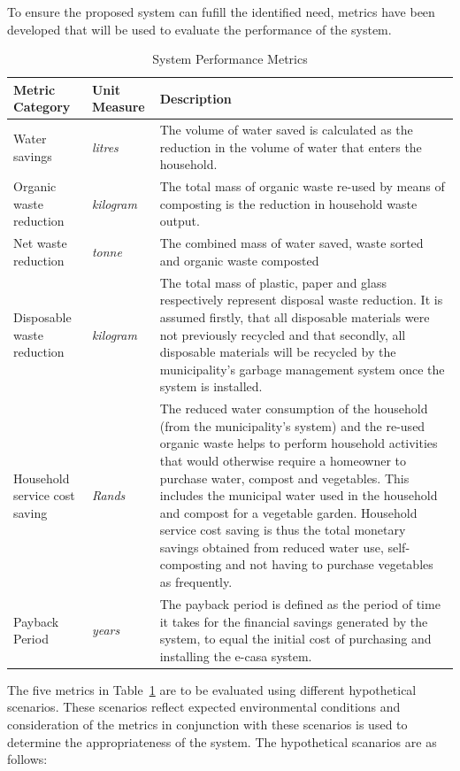 \documentclass[a4paper,11pt,fleqn]{report}
\begin{document}
To ensure the proposed system can fufill the identified need, metrics have been developed that will be used to evaluate the performance of the system.
%
\begin{table}[h!]
\caption {System Performance Metrics} \label{tb: Performance_Metrics} 
\begin{center}
\begin{tabular}{p{5cm}|p{3cm}|p{8cm}}\toprule
	{\textbf{Metric Category}} & {\textbf{Unit Measure}} & {\textbf{Description}}\\ \midrule
    Water savings & \textit{litres} & The volume of water saved is calculated as the reduction in the volume of water that enters the household. \\
    \hline
    Organic waste reduction & \textit{kilogram} & The total mass of organic waste re-used by means of composting is the reduction in household waste output.\\
    \hline
    Net waste reduction & \textit{tonne} & The combined mass of water saved, waste sorted and organic waste composted\\
    \hline
    Disposable waste reduction & \textit{kilogram} & The total mass of plastic, paper and glass respectively represent disposal waste reduction. It is assumed firstly, that all disposable materials were not previously recycled and that secondly, all disposable materials will be recycled by the municipality's garbage management system once the system is installed.\\
    \hline
    Household service cost saving & \textit{Rands} & The reduced water consumption of the household (from the municipality's system) and the re-used organic waste helps to perform household activities that would otherwise require a homeowner to purchase water, compost and vegetables. This includes the municipal water used in the household and compost for a vegetable garden. Household service cost saving is thus the total monetary savings obtained from reduced water use, self-composting and not having to purchase vegetables as frequently.\\
    \hline
    Payback Period & \textit{years} & The payback period is defined as the period of time it takes for the financial savings generated by the system, to equal the initial cost of purchasing and installing the \ac{e-casa} system. \\ \bottomrule
\end{tabular}
\end{center}
\end{table}
%
The five metrics in Table~\ref{tb: Performance_Metrics} are to be evaluated using different hypothetical scenarios. These scenarios reflect expected environmental conditions and consideration of the metrics in conjunction with these scenarios is used to determine the appropriateness of the system. The hypothetical scanarios are as follows:
\end{document}
